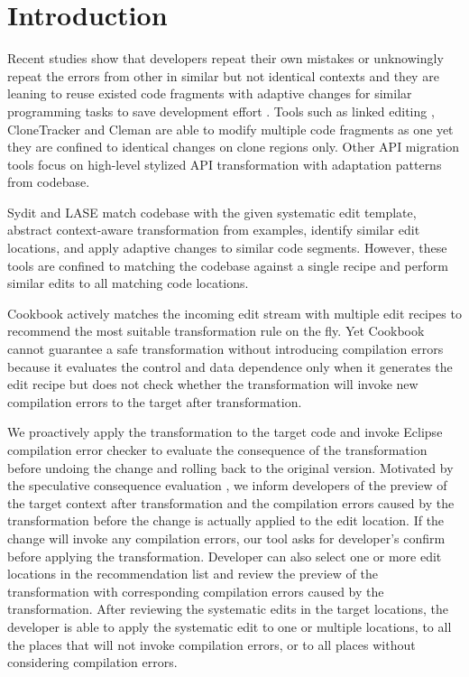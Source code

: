 \section{Introduction}

Recent studies show that developers repeat their own mistakes or unknowingly repeat the errors from other in similar but not identical contexts and they are leaning to reuse existed code fragments with adaptive changes for similar programming tasks to save development effort \cite{nguyen:evolve}.   Tools such as linked editing \cite{graham:linkedit04}, CloneTracker \cite{ekwa:clonetracker07} and Cleman \cite{nguyen:cleman08} are able to modify multiple code fragments as one yet they are confined to identical changes on clone regions only.   Other  API migration tools  \cite{nguyen:api, andersen:semantic, nguyen:graph}  focus on high-level stylized API transformation with adaptation patterns from codebase. 


Sydit \cite{meng:sydit} and LASE \cite{meng:lase} match codebase with the given systematic edit template,  abstract context-aware transformation from examples,  identify similar edit locations,  and apply adaptive changes to similar code segments.  However,   these tools are confined to matching the codebase against a single recipe and perform similar edits to all matching code locations. %

 Cookbook \cite{john:cookbook}     actively matches the incoming edit stream with multiple edit recipes to recommend the most suitable transformation rule on the fly.  Yet  Cookbook cannot guarantee a safe transformation without introducing compilation errors because it evaluates the control and data dependence only when it generates the edit recipe but does not check whether the transformation will invoke new compilation errors to the target after transformation.  
 
 We proactively apply the transformation to the target code and invoke Eclipse compilation error checker to evaluate the consequence of the transformation before undoing the change and rolling back to the original version. Motivated by the speculative consequence evaluation \cite{muslu:offline}, we  inform developers of  the preview of the target context after transformation and the compilation errors caused by the transformation before the change is actually applied to the edit location. 
If the change will invoke any compilation errors, our tool asks for developer's confirm before applying the transformation. Developer can also select one or more edit locations in the recommendation list and review the preview of the transformation with corresponding compilation errors caused by the transformation. After reviewing the systematic edits in the target locations, the developer is able to apply the systematic edit to one or multiple locations, to all the places that will not invoke compilation errors, or to all places without considering compilation errors. 


